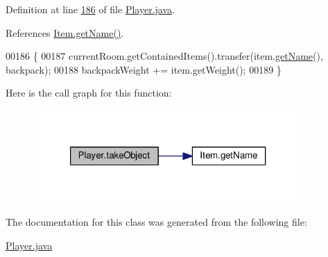 Definition at line \hyperlink{Player_8java_source_l00186}{186} of file \hyperlink{Player_8java_source}{Player.\-java}.



References \hyperlink{Item_8java_source_l00039}{Item.\-get\-Name()}.


\begin{DoxyCode}
00186                                       \{
00187         currentRoom.getContainedItems().transfer(item.\hyperlink{classItem_a78dd5a8370c5267c3f1f992167ab84ac}{getName}(), backpack);
00188         backpackWeight += item.getWeight();
00189     \}
\end{DoxyCode}


Here is the call graph for this function\-:
\nopagebreak
\begin{figure}[H]
\begin{center}
\leavevmode
\includegraphics[width=292pt]{classPlayer_a256305370cf457a32791d68c73e0b236_cgraph}
\end{center}
\end{figure}




The documentation for this class was generated from the following file\-:\begin{DoxyCompactItemize}
\item 
\hyperlink{Player_8java}{Player.\-java}\end{DoxyCompactItemize}
